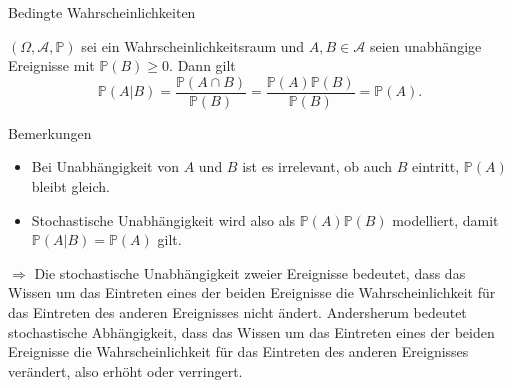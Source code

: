 \documentclass[
  8pt,
  ignorenonframetext,
]{beamer}
\begin{document}
\begin{frame}{Bedingte Wahrscheinlichkeiten}
\protect\hypertarget{bedingte-wahrscheinlichkeiten-3}{}
\small
\begin{theorem}
\normalfont
\justifying
$(\Omega,\mathcal{A}, \mathbb{P})$ sei ein Wahrscheinlichkeitsraum und 
$A,B\in \mathcal{A}$ seien unabhängige Ereignisse mit $\mathbb{P}(B) \ge 0$. 
Dann gilt
\begin{equation}
\mathbb{P}(A|B)
= \frac{\mathbb{P}(A \cap B)}{\mathbb{P}(B)}
= \frac{\mathbb{P}(A)\mathbb{P}(B)}{\mathbb{P}(B)}
= \mathbb{P}(A).
\end{equation}
\end{theorem}

\footnotesize

Bemerkungen

\begin{itemize}
\justifying
\item Bei Unabhängigkeit von $A$ und $B$ ist es irrelevant, ob auch $B$ eintritt,  $\mathbb{P}(A)$ bleibt gleich.
\item Stochastische Unabhängigkeit wird also als $\mathbb{P}(A)\mathbb{P}(B)$ modelliert, damit $\mathbb{P}(A|B) = \mathbb{P}(A)$ gilt.
\end{itemize}

\small

\(\Rightarrow\) Die stochastische Unabhängigkeit zweier Ereignisse
bedeutet, dass das Wissen um das Eintreten eines der beiden Ereignisse
die Wahrscheinlichkeit für das Eintreten des anderen Ereignisses nicht
ändert. Andersherum bedeutet stochastische Abhängigkeit, dass das Wissen
um das Eintreten eines der beiden Ereignisse die Wahrscheinlichkeit für
das Eintreten des anderen Ereignisses verändert, also erhöht oder
verringert.
\end{frame}
\end{document}

